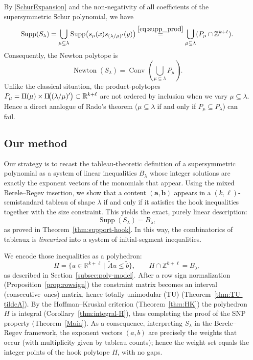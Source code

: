 \documentclass[12pt,a4paper,oneside]{amsart}
\theoremstyle{definition}
\DeclareMathOperator{\Supp}{Supp}
\DeclareMathOperator{\Conv}{Conv}
\DeclareMathOperator{\Newton}{Newton}
\newcommand{\Z}{\mathbb{Z}}
\begin{document}
By \eqref{SchurExpansion} and the non-negativity of all coefficients of the supersymmetric Schur polynomial, we have
\begin{equation} \label{eq:supp_s_lambda}
   \Supp(S_\lambda) = \bigcup_{\mu\subseteq\lambda} \Supp\bigl(s_\mu(x)s_{(\lambda/\mu)'}(y)\bigr) \stackrel{\eqref{eq:supp_prod}}{=} \bigcup_{\mu\subseteq\lambda}(P_\mu\cap\Z^{k+\ell}).
\end{equation}
Consequently, the Newton polytope is
\begin{equation} \label{eq:newton_s_lambda}
   \Newton(S_\lambda) = \Conv\!\left(\bigcup_{\mu\subseteq\lambda} P_\mu\right).
\end{equation}
Unlike the classical situation, the product-polytopes $P_\mu=\Pi(\mu)\times\Pi\!\bigl((\lambda/\mu)'\bigr)\subset\Bbb R^{k+\ell}$ are not ordered by inclusion when we vary $\mu\subseteq\lambda$. Hence a direct analogue of Rado’s theorem ($\mu\subseteq\lambda$  if and only if $P_\mu\subseteq P_\lambda$) can fail.

\subsection{Our method}
Our strategy is to recast the tableau-theoretic definition of a supersymmetric polynomial as a system of linear inequalities $B_\lambda$ whose integer solutions are exactly the exponent vectors of the monomials that appear. Using the mixed Berele–Regev insertion, we show that a content
\((\mathbf a,\mathbf b)\) appears in a \((k,\ell)\)-semistandard tableau of shape \(\lambda\) if and only if it satisfies the hook inequalities together with the size constraint. This yields the exact, purely linear description:
\[
   \Supp(S_\lambda)=B_\lambda,
\]
as proved in Theorem~\ref{thm:support-hook}. In this way, the combinatorics of tableaux is \emph{linearized} into a system of initial-segment inequalities.

We encode those inequalities as a polyhedron:
\[
   H=\{u\in\mathbb R^{k+\ell}\mid \widetilde A u\le \widetilde b\},
\qquad
H\cap\mathbb Z^{k+\ell}=B_\lambda,
\]
as described in Section~\ref{subsec:poly-model}. After a row sign normalization (Proposition~\ref{prop:rowsign}) the constraint matrix becomes an interval (consecutive–ones) matrix, hence totally unimodular (TU)
(Theorem~\ref{thm:TU-tildeA}). By the Hoffman–Kruskal criterion (Theorem~\ref{thm:HK}) the polyhedron \(H\) is integral (Corollary~\ref{thm:integral-H}), thus completing the proof of the SNP property (Theorem~\ref{Main}). As a consequence, interpreting $S_\lambda$ in the Berele–Regev framework, the exponent vectors $(a,b)$ are precisely the weights that occur (with multiplicity given by tableau counts); hence the weight set equals the integer points of the hook polytope $H$, with no gaps.
\end{document}
